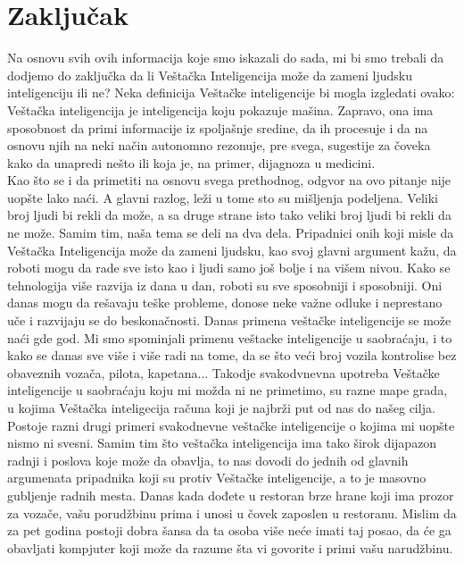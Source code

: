 \documentclass[a4paper]{article}
\begin{document}
\newpage

\section{Zaključak}
\label{sec:zakljucak}

Na osnovu svih ovih informacija koje smo iskazali do sada, mi bi smo trebali da dodjemo do zaključka da li Veštačka Inteligencija može da zameni ljudsku inteligenciju ili ne? Neka definicija Veštačke inteligencije bi mogla izgledati ovako: Veštačka inteligencija je inteligencija koju pokazuje mašina. Zapravo, ona ima sposobnost da primi informacije iz spoljašnje sredine, da ih procesuje i da na osnovu njih na neki način autonomno rezonuje, pre svega, sugestije za čoveka kako da unapredi nešto ili koja je, na primer, dijagnoza u medicini.\\
Kao što se i da primetiti na osnovu svega prethodnog, odgvor na ovo pitanje nije uopšte lako naći. A glavni razlog, leži u tome sto su mišljenja podeljena. Veliki broj ljudi bi rekli da može, a sa druge strane isto tako veliki broj ljudi bi rekli da ne može. Samim tim, naša tema se deli na dva dela. Pripadnici onih koji misle da Veštačka Inteligencija može da zameni ljudsku, kao svoj glavni argument kažu, da roboti mogu da rade sve isto kao i ljudi samo još bolje i na višem nivou. Kako se tehnologija više razvija iz dana u dan, roboti su sve sposobniji i sposobniji. Oni danas mogu da rešavaju teške probleme, donose neke važne odluke i neprestano uče i razvijaju se do beskonačnosti. Danas primena veštačke inteligencije se može naći gde god. Mi smo spominjali primenu veštacke inteligencije u saobraćaju, i to kako se danas sve više i više radi na tome, da se što veći broj vozila kontrolise bez obaveznih vozača, pilota, kapetana... Takodje svakodvnevna upotreba Veštačke inteligencije u saobraćaju koju mi možda ni ne primetimo, su razne mape grada, u kojima Veštačka inteligecija računa koji je najbrži put od nas do našeg cilja. Postoje razni drugi primeri svakodnevne veštačke inteligencije o kojima mi uopšte nismo ni svesni. Samim tim što veštačka inteligencija ima tako širok dijapazon radnji i poslova koje može da obavlja, to nas dovodi do jednih od glavnih argumenata pripadnika koji su protiv Veštačke inteligencije, a to je masovno gubljenje radnih mesta. Danas kada dođete u restoran brze hrane koji ima prozor za vozače, vašu porudžbinu prima i unosi u čovek zaposlen u restoranu. Mislim da za pet godina postoji dobra šansa da ta osoba više neće imati taj posao, da će ga obavljati kompjuter koji može da razume šta vi govorite i primi vašu narudžbinu.\\
\end{document}
